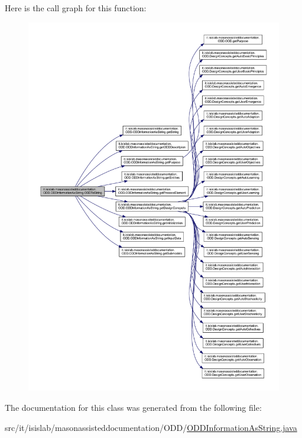 Here is the call graph for this function\-:
\nopagebreak
\begin{figure}[H]
\begin{center}
\leavevmode
\includegraphics[width=350pt]{classit_1_1isislab_1_1masonassisteddocumentation_1_1_o_d_d_1_1_o_d_d_information_as_string_ab14896c1ad0c20f9895a802bef0283fa_cgraph}
\end{center}
\end{figure}




The documentation for this class was generated from the following file\-:\begin{DoxyCompactItemize}
\item 
src/it/isislab/masonassisteddocumentation/\-O\-D\-D/\hyperlink{_o_d_d_information_as_string_8java}{O\-D\-D\-Information\-As\-String.\-java}\end{DoxyCompactItemize}
